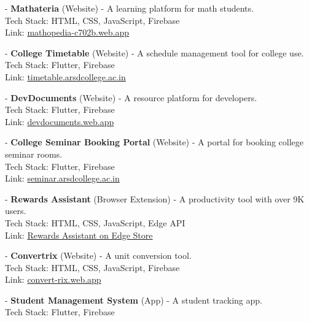\documentclass[12pt, a4paper]{article}
\begin{document}
- \textbf{Mathateria} (Website) - A learning platform for math students. \\
  Tech Stack: HTML, CSS, JavaScript, Firebase \\
  Link: \href{https://mathopedia-c702b.web.app/}{mathopedia-c702b.web.app}

- \textbf{College Timetable} (Website) - A schedule management tool for college use. \\
  Tech Stack: Flutter, Firebase \\
  Link: \href{https://timetable.arsdcollege.ac.in/}{timetable.arsdcollege.ac.in}

- \textbf{DevDocuments} (Website) - A resource platform for developers. \\
  Tech Stack: Flutter, Firebase \\
  Link: \href{https://devdocuments.web.app/}{devdocuments.web.app}

- \textbf{College Seminar Booking Portal} (Website) - A portal for booking college seminar rooms. \\
  Tech Stack: Flutter, Firebase \\
  Link: \href{https://seminar.arsdcollege.ac.in/}{seminar.arsdcollege.ac.in}

- \textbf{Rewards Assistant} (Browser Extension) - A productivity tool with over 9K users. \\
  Tech Stack: HTML, CSS, JavaScript, Edge API \\
  Link: \href{https://edge-stats.com/d/kkpjhahghfmbiibocfblallmginjfbpb}{Rewards Assistant on Edge Store}

- \textbf{Convertrix} (Website) - A unit conversion tool. \\
  Tech Stack: HTML, CSS, JavaScript, Firebase \\
  Link: \href{https://convert-rix.web.app/}{convert-rix.web.app}

- \textbf{Student Management System} (App) - A student tracking app. \\
  Tech Stack: Flutter, Firebase
\end{document}
